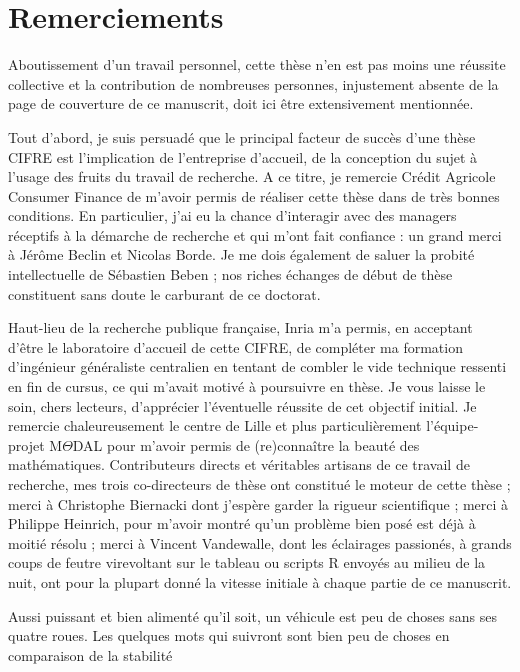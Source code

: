 \chapter{Remerciements}

Aboutissement d'un travail personnel, cette thèse n'en est pas moins une réussite collective et la contribution de nombreuses personnes, injustement absente de la page de couverture de ce manuscrit, doit ici être extensivement mentionnée.

Tout d'abord, je suis persuadé que le principal facteur de succès d'une thèse CIFRE est l'implication de l'entreprise d'accueil, de la conception du sujet à l'usage des fruits du travail de recherche. A ce titre, je remercie Crédit Agricole Consumer Finance de m'avoir permis de réaliser cette thèse dans de très bonnes conditions. En particulier, j'ai eu la chance d'interagir avec des managers réceptifs à la démarche de recherche et qui m'ont fait confiance : un grand merci à Jérôme Beclin et Nicolas Borde. Je me dois également de saluer la probité intellectuelle de Sébastien Beben ; nos riches échanges de début de thèse constituent sans doute le carburant de ce doctorat.

Haut-lieu de la recherche publique française, Inria m'a permis, en acceptant d'être le laboratoire d'accueil de cette CIFRE, de compléter ma formation d'ingénieur généraliste centralien en tentant de combler le vide technique ressenti en fin de cursus, ce qui m'avait motivé à poursuivre en thèse. Je vous laisse le soin, chers lecteurs, d'apprécier l'éventuelle réussite de cet objectif initial. Je remercie chaleureusement le centre de Lille et plus particulièrement l'équipe-projet M$\Theta$DAL pour m'avoir permis de (re)connaître la beauté des mathématiques. Contributeurs directs et véritables artisans de ce travail de recherche, mes trois co-directeurs de thèse ont constitué le moteur de cette thèse ; merci à Christophe Biernacki dont j'espère garder la rigueur scientifique ; merci à Philippe Heinrich, pour m'avoir montré qu'un problème bien posé est déjà à moitié résolu ; merci à Vincent Vandewalle, dont les éclairages passionés, à grands coups de feutre virevoltant sur le tableau ou scripts \textsf{R} envoyés au milieu de la nuit, ont pour la plupart donné la vitesse initiale à chaque partie de ce manuscrit.

Aussi puissant et bien alimenté qu'il soit, un véhicule est peu de choses sans ses quatre roues. Les quelques mots qui suivront sont bien peu de choses en comparaison de la stabilité 
